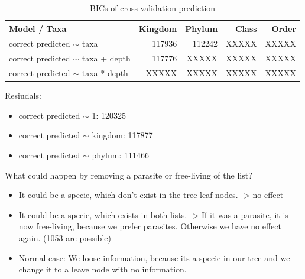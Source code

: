       \begin{table}[h]
        \begin{center}
          \begin{tabular}{ |l|r|r|r|r| }
            \hline
            Model / Taxa & Kingdom & Phylum & Class & Order \\
            \hline \hline
            correct predicted $\sim$ taxa & 117936 & 112242 & XXXXX & XXXXX \\
            \hline
            correct predicted $\sim$ taxa + depth & 117776 & XXXXX & XXXXX & XXXXX \\
            \hline
            correct predicted $\sim$ taxa * depth & XXXXX & XXXXX & XXXXX & \cellcolor{green!60}XXXXX \\
            \hline
          \end{tabular} 
        \end{center}
        \caption{BICs of cross validation prediction}
        \label{table:BIC cross validation} 
      \end{table}

      Resiudals:
      \begin{itemize}
        \item correct predicted $\sim$ 1: 120325
        \item correct predicted $\sim$ kingdom: 117877
        \item correct predicted $\sim$ phylum: 111466
      \end{itemize}

      What could happen by removing a parasite or free-living of the list?
      \begin{itemize}
        \item It could be a specie, which don't exist in the tree leaf nodes. -> no effect
        \item It could be a specie, which exists in both lists. -> If it was a parasite, it is now 
          free-living, because we prefer parasites. Otherwise we have no effect again. (1053 are possible)
        \item Normal case: We loose information, because its a specie in our tree and we change it to a 
          leave node with no information.
      \end{itemize}

